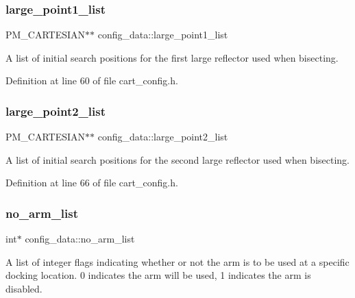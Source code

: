\mbox{\label{structconfig__data_a7b2d512bbdc163be02d2ca8978180c34}} 
\subsubsection{\texorpdfstring{large\+\_\+point1\+\_\+list}{large\_point1\_list}}
{\footnotesize\ttfamily P\+M\+\_\+\+C\+A\+R\+T\+E\+S\+I\+AN$\ast$$\ast$ config\+\_\+data\+::large\+\_\+point1\+\_\+list}

A list of initial search positions for the first large reflector used when bisecting. 

Definition at line 60 of file cart\+\_\+config.\+h.

\mbox{\label{structconfig__data_ae7e80641b121bea61d098ee3567052f9}} 
\subsubsection{\texorpdfstring{large\+\_\+point2\+\_\+list}{large\_point2\_list}}
{\footnotesize\ttfamily P\+M\+\_\+\+C\+A\+R\+T\+E\+S\+I\+AN$\ast$$\ast$ config\+\_\+data\+::large\+\_\+point2\+\_\+list}

A list of initial search positions for the second large reflector used when bisecting. 

Definition at line 66 of file cart\+\_\+config.\+h.

\mbox{\label{structconfig__data_a05d5897890c90a80bfcc574a2691a367}} 
\subsubsection{\texorpdfstring{no\+\_\+arm\+\_\+list}{no\_arm\_list}}
{\footnotesize\ttfamily int$\ast$ config\+\_\+data\+::no\+\_\+arm\+\_\+list}

A list of integer flags indicating whether or not the arm is to be used at a specific docking location. 0 indicates the arm will be used, 1 indicates the arm is disabled. 

